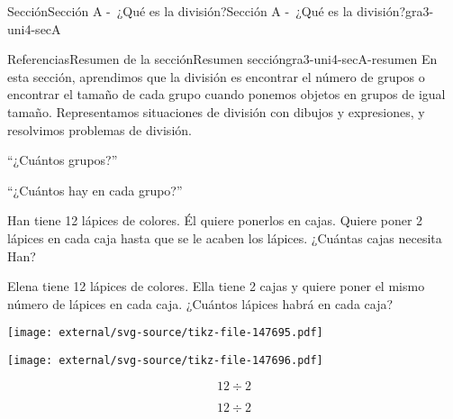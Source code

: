 \documentclass[twoside,14pt,]{extarticle}
\begin{document}
\begin{sectionptx}{Sección}{Sección A -~¿Qué es la división?}{}{Sección A -~¿Qué es la división?}{}{}{gra3-uni4-secA}
\typeout{************************************************}
%
\begin{references-subsection}{Referencias}{Resumen de la sección}{}{Resumen sección}{}{}{gra3-uni4-secA-resumen}
En esta sección, aprendimos que la división es encontrar el número de grupos o encontrar el tamaño de cada grupo cuando ponemos objetos en grupos de igual tamaño. Representamos situaciones de división con dibujos y expresiones, y resolvimos problemas de división.%
\begin{sidebyside}{2}{0.025}{0.025}{0.05}%
\begin{sbspanel}{0.45}%
``¿Cuántos grupos?''%
\end{sbspanel}%
\begin{sbspanel}{0.45}%
\par
``¿Cuántos hay en cada grupo?''%
\end{sbspanel}%
\end{sidebyside}%
\begin{sidebyside}{2}{0.025}{0.025}{0.05}%
\begin{sbspanel}{0.45}%
Han tiene 12 lápices de colores. Él quiere ponerlos en cajas. Quiere poner 2 lápices en cada caja hasta que se le acaben los lápices. ¿Cuántas cajas necesita Han?%
\end{sbspanel}%
\begin{sbspanel}{0.45}%
\par
Elena tiene 12 lápices de colores. Ella tiene 2 cajas y quiere poner el mismo número de lápices en cada caja. ¿Cuántos lápices habrá en cada caja?%
\end{sbspanel}%
\end{sidebyside}%
\begin{sidebyside}{2}{0.025}{0.025}{0.05}%
\begin{sbspanel}{0.45}%
\texttt{[image: external/svg-source/tikz-file-147695.pdf]}
\end{sbspanel}%
\begin{sbspanel}{0.45}%
\texttt{[image: external/svg-source/tikz-file-147696.pdf]}
\end{sbspanel}%
\end{sidebyside}%
\begin{sidebyside}{2}{0.025}{0.025}{0.05}%
\begin{sbspanel}{0.45}%
%
\begin{equation*}
12 \div 2
\end{equation*}
%
\end{sbspanel}%
\begin{sbspanel}{0.45}%
\par
%
\begin{equation*}
12 \div 2
\end{equation*}
%
\end{sbspanel}%
\end{sidebyside}%
\end{references-subsection}
\end{sectionptx}
\end{document}
